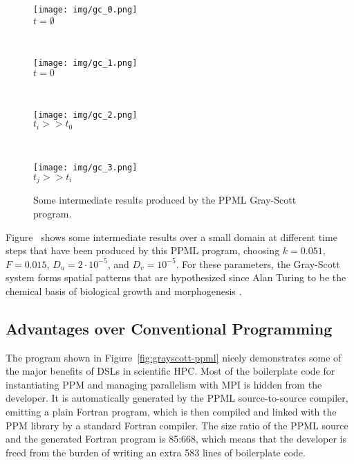 {\begin{figure}
\centering
\begin{minipage}[c]{0.24\textwidth}%
\centering\texttt{[image: img/gc\_0.png]}
\\\scriptsize $t=\emptyset$
\end{minipage}%
~
\begin{minipage}[c]{0.24\textwidth}%
\centering\texttt{[image: img/gc\_1.png]}
\\\scriptsize $t=0$
\end{minipage}%
~
\begin{minipage}[c]{0.24\textwidth}%
\centering\texttt{[image: img/gc\_2.png]}
\\\scriptsize $t_i>>t_0$
\end{minipage}%
~
\begin{minipage}[c]{0.24\textwidth}%
\centering\texttt{[image: img/gc\_3.png]}
\\\scriptsize $t_j>>t_i$
\end{minipage}%
\caption{Some intermediate results produced by the PPML Gray-Scott program.}%
\label{fig:grayscott-ppml-sim}%
\end{figure}}
%
Figure~\revii{\ref{fig:grayscott-ppml-sim}} shows some intermediate results over a small domain at different time steps that have been produced by this PPML program, choosing $k=0.051$, $F=0.015$, $D_u = 2\cdot 10^{-5}$, and $D_v = 10^{-5}$. For these parameters, the Gray-Scott system forms spatial patterns that are hypothesized since Alan Turing to be the chemical basis of biological growth and morphogenesis \cite{Turing:1952}.

\subsection{Advantages over Conventional Programming}
The program shown in Figure~\ref{fig:grayscott-ppml} nicely demonstrates some of the major benefits of DSLs in scientific HPC. Most of the boilerplate code
for instantiating PPM and managing parallelism with MPI is hidden from the developer. It is automatically generated by the PPML source-to-source compiler, emitting a plain Fortran
program, which is then compiled and linked with the PPM library by a standard Fortran compiler. The size ratio of the PPML source and the generated Fortran program
is 85:668, which means that the developer is freed from the burden of writing an extra 583 lines of boilerplate code.

